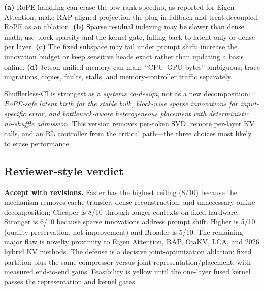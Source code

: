\documentclass[11pt]{article}
\begin{document}
\begin{riskbox}
\textbf{(a)} RoPE handling can erase the low-rank speedup, as reported for Eigen Attention;
make RAP-aligned projection the plug-in fallback and treat decoupled RoPE as an ablation.
\textbf{(b)} Sparse residual indexing may be slower than dense math; use block sparsity and
the kernel gate, falling back to latent-only or dense per layer.
\textbf{(c)} The fixed subspace may fail under prompt shift; increase the innovation budget
or keep sensitive heads exact rather than updating a basis online.
\textbf{(d)} Jetson unified memory can make ``CPU--GPU bytes'' ambiguous; trace migrations,
copies, faults, stalls, and memory-controller traffic separately.
\end{riskbox}

\begin{claimbox}
Shufflerless-CI is strongest as a \emph{systems co-design}, not as a new decomposition:
\emph{RoPE-safe latent birth for the stable bulk, block-wise sparse innovations for
input-specific error, and bottleneck-aware heterogeneous placement with deterministic
no-shuffle admission}. This version removes per-token SVD, remote per-layer KV calls, and an
RL controller from the critical path---the three choices most likely to erase performance.
\end{claimbox}

\subsection*{Reviewer-style verdict}
\textbf{Accept with revisions.} Faster has the highest ceiling (8/10) because the mechanism
removes cache transfer, dense reconstruction, and unnecessary online decomposition; Cheaper is
8/10 through longer contexts on fixed hardware; Stronger is 6/10 because sparse innovations
address prompt shift. Higher is 5/10 (quality preservation, not improvement) and Broader is 5/10.
The remaining major flaw is novelty proximity to Eigen Attention, RAP, OjaKV, LCA, and 2026 hybrid
KV methods. The defense is a decisive joint-optimization ablation: fixed partition plus the same
compressor versus joint representation/placement, with measured end-to-end gains. Feasibility is
yellow until the one-layer fused kernel passes the representation and kernel gates.
\end{document}
